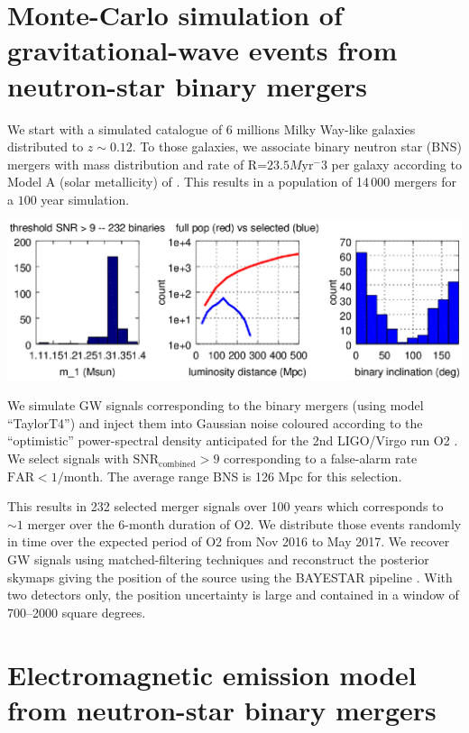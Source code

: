 \documentclass[11pt]{article}
\begin{document}
\section*{Monte-Carlo simulation of gravitational-wave events from neutron-star binary mergers}

We start with a simulated catalogue of 6 millions Milky Way-like galaxies
distributed to $z\sim 0.12$. To those galaxies, we associate binary neutron star
(BNS) mergers with mass distribution and rate of R=$23.5 M\mathrm{yr}^-3$ per galaxy
according to Model A (solar metallicity) of
\citep{2012ApJ...759...52D}. This results in a population of 14\,000
mergers for a $100$ year simulation.

\begin{center}
   \includegraphics[scale=.7]{SP_f1.eps}
\end{center}

We simulate GW signals corresponding to the binary mergers (using model
``TaylorT4'') and inject them into Gaussian noise coloured according to the
``optimistic'' power-spectral density anticipated for the 2nd LIGO/Virgo run O2
\citep{2016LRR....19....1A}. We select signals with $\mathrm{SNR}_{\mathrm{combined}} > 9$
corresponding to a false-alarm rate $\mathrm{FAR} < 1/\mathrm{month}$. The
average range BNS is 126 Mpc for this selection.

This results in 232 selected merger signals over 100 years which corresponds to
$\sim 1$ merger over the 6-month duration of O2. We distribute those events
randomly in time over the expected period of O2 from Nov 2016 to May 2017. We
recover GW signals using matched-filtering techniques and reconstruct the
posterior skymaps giving the position of the source using the BAYESTAR pipeline
\citep{2016PhRvD..93b4013S}.  With two detectors only, the position uncertainty is
large and contained in a window of 700--2000 square degrees.

\section*{Electromagnetic emission model from neutron-star binary mergers}
\end{document}
